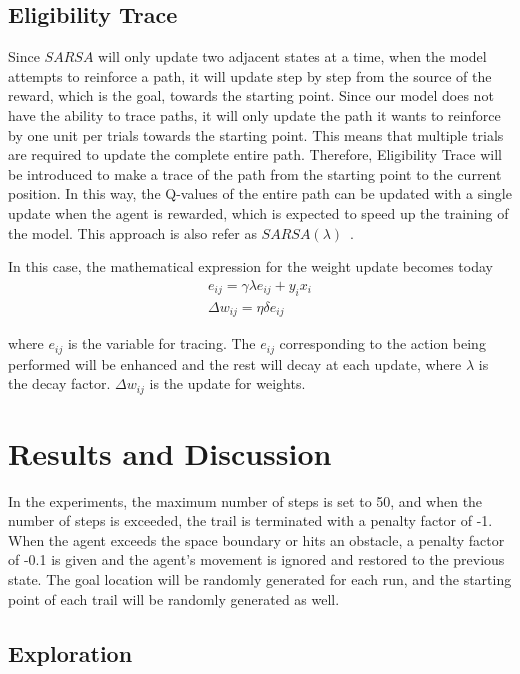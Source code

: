 \documentclass[conference]{IEEEtran}
\begin{document}
\subsection{Eligibility Trace}

Since \(SARSA\) will only update two adjacent states at a time, when the model attempts to reinforce a path, it will update step by step from the source of the reward, which is the goal, towards the starting point. Since our model does not have the ability to trace paths, it will only update the path it wants to reinforce by one unit per trials towards the starting point. This means that multiple trials are required to update the complete entire path. Therefore, Eligibility Trace will be introduced to make a trace of the path from the starting point to the current position. In this way, the Q-values of the entire path can be updated with a single update when the agent is rewarded, which is expected to speed up the training of the model. This approach is also refer as \(SARSA(\lambda)\)~\cite{richard2018sarsalambda}.

In this case, the mathematical expression for the weight update becomes today
\begin{eqnarray}
    e_{ij} = \gamma \lambda e_{ij} + y_i x_i \\
    \Delta w_{ij} = \eta \delta e_{ij}
\end{eqnarray}

where \(e_{ij}\) is the variable for tracing. The  \(e_{ij}\) corresponding to the action being performed will be enhanced and the rest will decay at each update, where \({\lambda}\) is the decay factor. \(\Delta w_{ij}\) is the update for weights.

\section{Results and Discussion}

In the experiments, the maximum number of steps is set to 50, and when the number of steps is exceeded, the trail is terminated with a penalty factor of -1. When the agent exceeds the space boundary or hits an obstacle, a penalty factor of -0.1 is given and the agent's movement is ignored and restored to the previous state. The goal location will be randomly generated for each run, and the starting point of each trail will be randomly generated as well. 

\subsection{Exploration}
\end{document}
